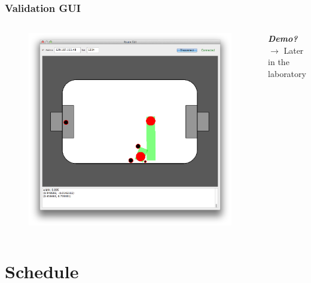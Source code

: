 \documentclass[hyperref={pdfpagelabels=false}]{beamer}
\begin{document}
\begin{frame}
    \frametitle{Validation GUI}
    \begin{columns}[T]
        \begin{column}{0.4\textwidth}
            \begin{figure}
                \center
                \includegraphics[width=\textwidth]{Pictures/gui-1}
            \end{figure}
        \end{column}
        \begin{column}{0.6\textwidth}
            \begin{minipage}[c][.57\textheight][c]{\linewidth}
                \begin{center}
                    \textbf{\textit{\Large Demo?}}\\
                    $\rightarrow$ Later in the laboratory
                \end{center}
            \end{minipage}
        \end{column}
    \end{columns}   
\end{frame}


\section{Schedule}
\end{document}
